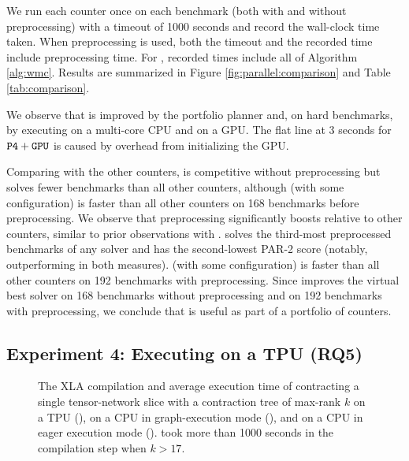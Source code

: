 We run each counter once on each benchmark (both with and without  preprocessing) with a timeout of 1000 seconds and record the wall-clock time taken. When preprocessing is used, both the timeout and the recorded time include preprocessing time. For , recorded times include all of Algorithm \ref{alg:wmc}. Results are summarized in Figure \ref{fig:parallel:comparison} and Table \ref{tab:comparison}. 

We observe that  is improved by the portfolio planner and, on hard benchmarks, by executing on a multi-core CPU and on a GPU. The flat line at 3 seconds for $\texttt{\upshape P4}+\texttt{\upshape GPU}$ is caused by overhead from initializing the GPU.

Comparing  with the other counters,  is competitive without preprocessing but solves fewer benchmarks than all other counters, although  (with some configuration) is faster than all other counters on 168 benchmarks before preprocessing. 
We observe that preprocessing significantly boosts  relative to other counters, similar to prior observations with  \cite{FHZ19}.  solves the third-most preprocessed benchmarks of any solver and has the second-lowest PAR-2 score (notably, outperforming  in both measures).  (with some configuration) is faster than all other counters on 192 benchmarks with preprocessing. Since  improves the virtual best solver on 168 benchmarks without preprocessing and on 192 benchmarks with preprocessing, we conclude that  is useful as part of a portfolio of counters.

\subsection{Experiment 4: Executing on a TPU (RQ5)}
\label{sec:parallel:exp:tpu}
\begin{figure}[t]
\begin{center}

%
\vspace*{-0.9cm}
\caption{\label{fig:parallel:tpu} The XLA compilation and average execution time of contracting a single tensor-network slice with a contraction tree of max-rank $k$ on a TPU (), on a CPU in graph-execution mode (), and on a CPU in eager execution mode ().  took more than 1000 seconds in the compilation step when $k > 17$.}
\end{center}
\vspace*{-0.8cm}
\end{figure}

